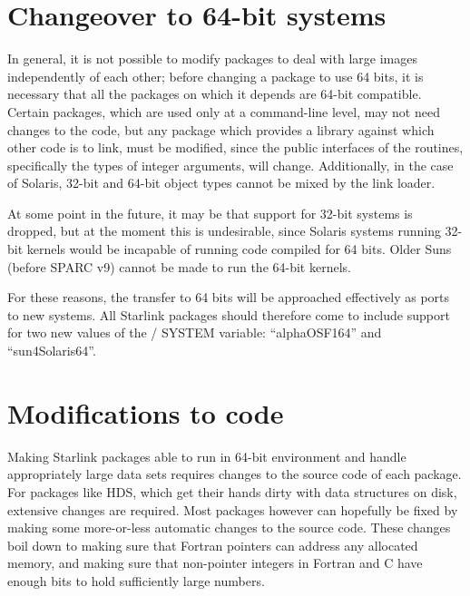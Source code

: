 \documentclass[twoside,11pt]{article}
\newcommand{\xref}[3]{#1}
\renewcommand{\_}{\texttt{\symbol{95}}}
\begin{document}
\section{Changeover to 64-bit systems}

In general, it is not possible to modify packages to deal with large
images independently of each other;
before changing a package to use 64 bits, it is necessary 
that all the packages on which it depends are 64-bit compatible.
Certain packages, which are used only at a command-line level, 
may not need changes to the code, but any package which provides a library 
against which other code is to link, must be modified,
since the public interfaces of the routines,
specifically the types of integer arguments, will change. 
Additionally, in the case of Solaris,
32-bit and 64-bit object types cannot be mixed by the link loader.

At some point in the future, it may be that support for 32-bit systems
is dropped, but at the moment this is undesirable, since 
Solaris systems running 32-bit kernels would be incapable of running
code compiled for 64 bits.  
Older Suns (before SPARC v9) cannot be made to run the 64-bit kernels.

For these reasons, the transfer to 64 bits will be approached
effectively as ports to new systems.  All Starlink packages should
therefore come to 
include support for two new values of the /
SYSTEM variable: ``alpha\_OSF1\_64'' and ``sun4\_Solaris\_64''.



\section{Modifications to code\label{sec:modificienda}}

Making Starlink packages able to run in 64-bit environment and 
handle appropriately large data sets requires changes to the source
code of each package.
For packages like \xref{HDS}{sun92}{}, 
which get their hands dirty with data structures on disk,
extensive changes are required.
Most packages however can hopefully be fixed by making some more-or-less
automatic changes to the source code.
These changes boil down to making sure that Fortran pointers 
can address any allocated memory,
and making sure that non-pointer integers in Fortran and C 
have enough bits to hold sufficiently large numbers.
\end{document}
